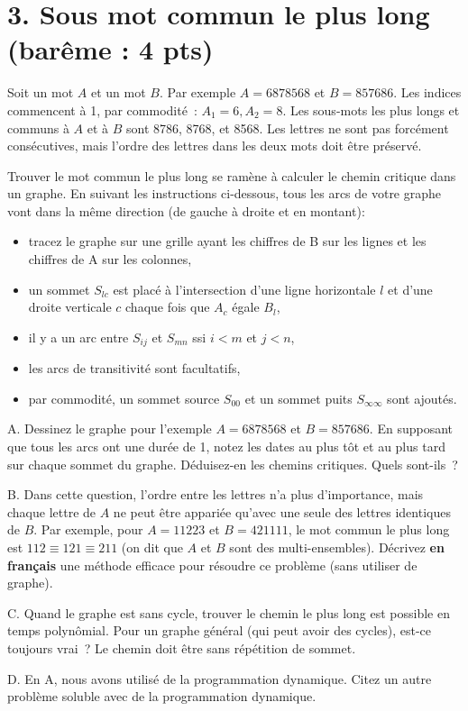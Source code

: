\documentclass[11pt]{article}
\begin{document}
{
\section*{3. Sous mot commun le plus long (barême : 4 pts)}
Soit un mot $A$ et un mot $B$. 
Par exemple $A=6878568$ et $B=857686$. 
Les indices commencent à 1, par commodité~: $A_1=6, A_2=8$.
Les sous-mots les plus longs et communs à $A$ et à $B$ sont
8786, 8768, et 8568. Les lettres ne sont pas forcément consécutives, mais l'ordre des lettres dans les deux mots doit être préservé.

\medskip
Trouver le mot commun le plus long se ramène à calculer le chemin critique dans un graphe. En suivant les instructions ci-dessous, tous les arcs de votre graphe vont dans la même direction (de gauche à droite et en montant):

\begin{itemize}
\item tracez le graphe sur une grille ayant les chiffres de B sur les lignes et les chiffres de A sur les colonnes,
\item un sommet $S_{lc}$ est placé à l'intersection d'une ligne horizontale $l$ et d'une droite verticale $c$ chaque fois que  $A_c$ égale $B_l$,
\item   il y a un arc entre $S_{ij}$ et $S_{mn}$ ssi $i<m$ et $j<n$,
\item les arcs de transitivité sont facultatifs, 
\item par commodité, un sommet source $S_{00}$ et un sommet puits $S_{\infty\infty}$ sont ajoutés.
\end{itemize}

\medskip
A. Dessinez le graphe pour l'exemple $A=6878568$ et $B=857686$.
En supposant que tous les arcs ont une durée de 1, notez les dates au plus tôt
et au plus tard sur chaque sommet du graphe. Déduisez-en les chemins critiques.
Quels sont-ils~? 

\medskip
B. Dans cette question, l'ordre entre les lettres n'a plus d'importance, mais  chaque lettre de $A$ ne peut être appariée    
qu'avec une seule des lettres identiques de  $B$.
Par exemple, pour $A=11223$ et $B=421111$, le mot commun le plus long est $112\equiv 121 \equiv 211$
(on dit que $A$ et $B$ sont des multi-ensembles).
Décrivez {\bf en français} une méthode efficace pour résoudre ce problème (sans utiliser de graphe).

\medskip
C. Quand le graphe est sans cycle, trouver le chemin le plus long est possible en temps polynômial. Pour un graphe général (qui peut avoir des cycles), est-ce toujours vrai~? Le chemin doit être sans répétition de sommet.

\medskip
D. En A, nous avons utilisé de la programmation dynamique. Citez un autre problème soluble avec de la programmation dynamique.
}
\end{document}
